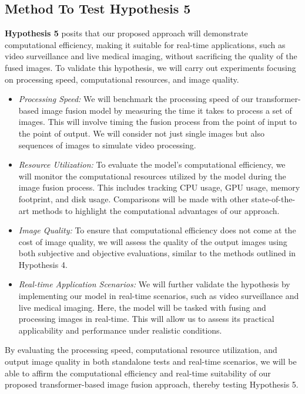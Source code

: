 \subsection{Method To Test Hypothesis 5} \label{subsec:met7}

\textbf{Hypothesis 5} posits that our proposed approach will demonstrate computational efficiency, making it suitable for real-time applications, such as video surveillance and live medical imaging, without sacrificing the quality of the fused images. To validate this hypothesis, we will carry out experiments focusing on processing speed, computational resources, and image quality.

\begin{itemize}
    \item \textit{Processing Speed:} We will benchmark the processing speed of our transformer-based image fusion model by measuring the time it takes to process a set of images. This will involve timing the fusion process from the point of input to the point of output. We will consider not just single images but also sequences of images to simulate video processing.

    \item \textit{Resource Utilization:} To evaluate the model's computational efficiency, we will monitor the computational resources utilized by the model during the image fusion process. This includes tracking CPU usage, GPU usage, memory footprint, and disk usage. Comparisons will be made with other state-of-the-art methods to highlight the computational advantages of our approach.

    \item \textit{Image Quality:} To ensure that computational efficiency does not come at the cost of image quality, we will assess the quality of the output images using both subjective and objective evaluations, similar to the methods outlined in Hypothesis 4.

    \item \textit{Real-time Application Scenarios:} We will further validate the hypothesis by implementing our model in real-time scenarios, such as video surveillance and live medical imaging. Here, the model will be tasked with fusing and processing images in real-time. This will allow us to assess its practical applicability and performance under realistic conditions.

\end{itemize}

By evaluating the processing speed, computational resource utilization, and output image quality in both standalone tests and real-time scenarios, we will be able to affirm the computational efficiency and real-time suitability of our proposed transformer-based image fusion approach, thereby testing Hypothesis 5.

